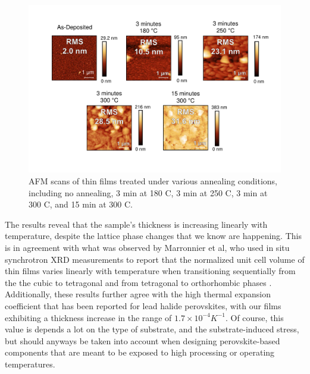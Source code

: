 \begin{figure}[htbp]
  \centering
  \medskip
  \includegraphics[width=1\textwidth]{chapters/ellipsometry/image/afm_all.pdf}
  \caption{AFM scans of  thin films treated under various annealing conditions, including no annealing, 3 min at 180 \degree C, 3 min at 250 \degree C, 3 min at 300 \degree C, and 15 min at 300 \degree C.}
  \label{fig:ellipsometry:afm_all}
\end{figure}


The results reveal that the sample's thickness is increasing linearly with temperature, despite the lattice phase changes that we know are happening. This is in agreement with what was observed by Marronnier et al, who used in situ synchrotron XRD measurements to report that the normalized unit cell volume of  thin films varies linearly with temperature when transitioning sequentially from the the cubic to tetragonal and from tetragonal to orthorhombic phases \cite{Marronnier2018AnharmonicityCells}. Additionally, these results further agree with the high thermal expansion coefficient that has been reported for lead halide perovskites, with our films exhibiting a thickness increase in the range of $1.7\times10^{-4}K^{-1}$. Of course, this value is depends a lot on the type of substrate, and the substrate-induced stress, but should anyways be taken into account when designing perovskite-based components that are meant to be exposed to high processing or operating temperatures. 

